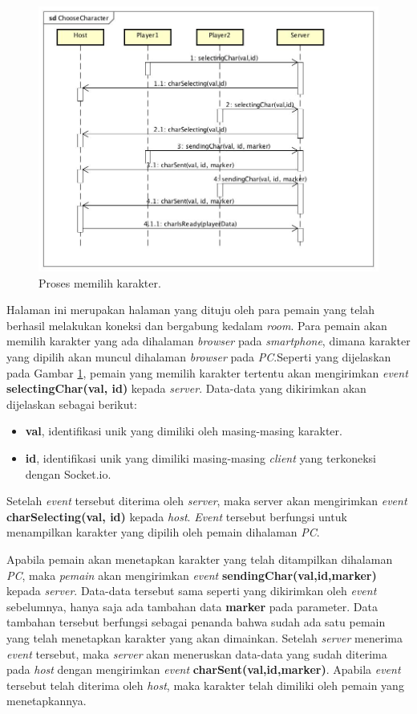 \begin{figure}[H]
	\centering
	\includegraphics[scale=0.35]{Gambar/ChooseCharacter}
	\caption{Proses memilih karakter.}
	\label{fig:2_ChooseCharacter}
\end{figure}

Halaman ini merupakan halaman yang dituju oleh para pemain yang telah berhasil melakukan koneksi dan bergabung kedalam \textit{room}. Para pemain akan memilih karakter yang ada dihalaman \textit{browser} pada \textit{smartphone}, dimana karakter yang dipilih akan muncul dihalaman \textit{browser} pada \textit{PC}.Seperti yang dijelaskan pada Gambar \ref{fig:2_ChooseCharacter}, pemain yang memilih karakter tertentu akan mengirimkan \textit{event} \textbf{selectingChar(val, id)} kepada \textit{server}. Data-data yang dikirimkan akan dijelaskan sebagai berikut:
\begin{itemize}
	\item \textbf{val}, identifikasi unik yang dimiliki oleh masing-masing karakter.
	\item \textbf{id}, identifikasi unik yang dimiliki masing-masing \textit{client} yang terkoneksi dengan Socket.io.
\end{itemize}
Setelah \textit{event} tersebut diterima oleh \textit{server}, maka server akan mengirimkan \textit{event} \textbf{charSelecting(val, id)} kepada \textit{host}. \textit{Event} tersebut berfungsi untuk menampilkan karakter yang dipilih oleh pemain dihalaman \textit{PC}.

Apabila pemain akan menetapkan karakter yang telah ditampilkan dihalaman \textit{PC}, maka \textit{pemain} akan mengirimkan \textit{event} \textbf{sendingChar(val,id,marker)} kepada \textit{server}. Data-data tersebut sama seperti yang dikirimkan oleh \textit{event} sebelumnya, hanya saja ada tambahan data \textbf{marker} pada parameter. Data tambahan tersebut berfungsi sebagai penanda bahwa sudah ada satu pemain yang telah menetapkan karakter yang akan dimainkan. Setelah \textit{server} menerima \textit{event} tersebut, maka \textit{server} akan meneruskan data-data yang sudah diterima pada \textit{host} dengan mengirimkan \textit{event} \textbf{charSent(val,id,marker)}. Apabila \textit{event} tersebut telah diterima oleh \textit{host}, maka karakter telah dimiliki oleh pemain yang menetapkannya.

